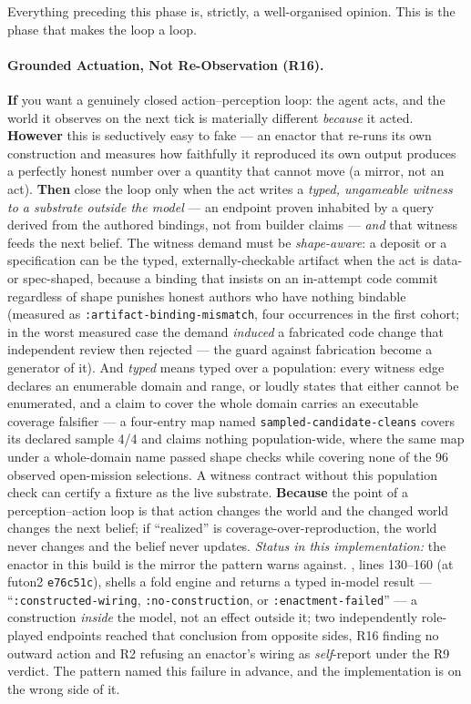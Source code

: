 Everything preceding this phase is, strictly, a well-organised opinion.  This is
the phase that makes the loop a loop.

\hypertarget{pat-r16}{}\paragraph{Grounded Actuation, Not Re-Observation (R16).}\label{pat:r16} \textbf{If} you want a genuinely closed action--perception loop: the agent acts, and the world it observes on the next tick is materially different \emph{because} it acted. \textbf{However} this is seductively easy to fake --- an enactor that re-runs its own construction and measures how faithfully it reproduced its own output produces a perfectly honest number over a quantity that cannot move (a mirror, not an act). \textbf{Then} close the loop only when the act writes a \emph{typed, ungameable witness to a substrate outside the model} --- an endpoint proven inhabited by a query derived from the authored bindings, not from builder claims --- \emph{and} that witness feeds the next belief.  The witness demand must be \emph{shape-aware}: a deposit or a specification can be the typed, externally-checkable artifact when the act is data- or spec-shaped, because a binding that insists on an in-attempt code commit regardless of shape punishes honest authors who have nothing bindable (measured as \texttt{:artifact-binding-mismatch}, four occurrences in the first cohort; in the worst measured case the demand \emph{induced} a fabricated code change that independent review then rejected --- the guard against fabrication become a generator of it).  And \emph{typed} means typed over a population: every witness edge declares an enumerable domain and range, or loudly states that either cannot be enumerated, and a claim to cover the whole domain carries an executable coverage falsifier --- a four-entry map named \texttt{sampled-candidate-cleans} covers its declared sample 4/4 and claims nothing population-wide, where the same map under a whole-domain name passed shape checks while covering none of the 96 observed open-mission selections.  A witness contract without this population check can certify a fixture as the live substrate. \textbf{Because} the point of a perception--action loop is that action changes the world and the changed world changes the next belief; if ``realized'' is coverage-over-reproduction, the world never changes and the belief never updates.  \emph{Status in this implementation:} the enactor in this build is the mirror the pattern warns against. , lines 130--160 (at futon2 \texttt{e76c51c}), shells a fold engine and returns a typed in-model result --- ``\texttt{:constructed-wiring}, \texttt{:no-construction}, or \texttt{:enactment-failed}'' --- a construction \emph{inside} the model, not an effect outside it; two independently role-played endpoints reached that conclusion from opposite sides, R16 finding no outward action and R2 refusing an enactor's wiring as \emph{self}-report under the R9 verdict.  The pattern named this failure in advance, and the implementation is on the wrong side of it.
